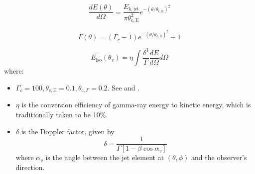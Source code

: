     \begin{equation}
        \dfrac{dE(\theta)}{d\Omega} =
            \dfrac{E_{\mathrm{k, jet}}}{\pi \theta_{\mathrm{c, E}}^2}
            e^{-(\theta/\theta_{\mathrm{c, E}})^2}
    \end{equation}

    \begin{equation}
        \Gamma(\theta) = (\Gamma_c - 1)e^{-(\theta/\theta_{\mathrm{c, E}})^2} + 1
    \end{equation}

    \begin{equation}
        E_{\mathrm{iso}}(\theta_v) =
            \eta \int \dfrac{\delta^3}{\Gamma} \dfrac{dE}{d\Omega} d\Omega
    \end{equation}
    where:

    \begin{itemize}

        \item $\Gamma_c = 100, \theta_{\mathrm{c, E}} = 0.1, \theta_{\mathrm{c}, \Gamma}
            = 0.2$.  See \cite{salafia_2015} and \cite{barbieri_2019}.

        \item $\eta$ is the conversion efficiency of gamma-ray energy to kinetic energy,
            which is traditionally taken to be 10\%.

        \item $\delta$ is the Doppler factor, given by $$\delta = \dfrac{1}{\Gamma[1 -
            \beta \cos \alpha_v]}$$ where $\alpha_v$ is the angle between the jet
            element at $(\theta, \phi)$ and the observer's direction.
    \end{itemize}

